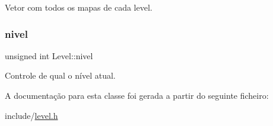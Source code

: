 Vetor com todos os mapas de cada level. 

\mbox{\label{classLevel_af40fbdea10408d1ae09698d49e072aa6}} 
\subsubsection{\texorpdfstring{nivel}{nivel}}
{\footnotesize\ttfamily unsigned int Level\+::nivel\hspace{0.3cm}{\ttfamily [private]}}



Controle de qual o nível atual. 



A documentação para esta classe foi gerada a partir do seguinte ficheiro\+:\begin{DoxyCompactItemize}
\item 
include/\hyperlink{level_8h}{level.\+h}\end{DoxyCompactItemize}
